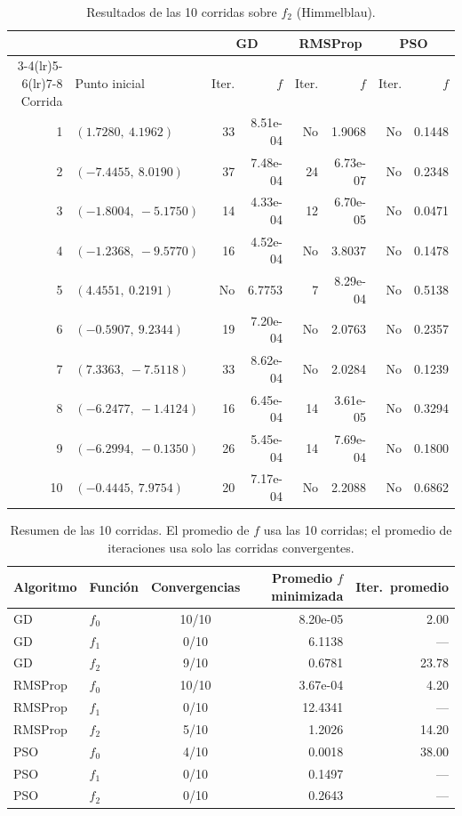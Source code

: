 \begin{table}[H]
\centering
\small
\begin{tabular}{rlrrrrrr}
\toprule
 & & \multicolumn{2}{c}{GD} & \multicolumn{2}{c}{RMSProp} & \multicolumn{2}{c}{PSO} \\
\cmidrule(lr){3-4}\cmidrule(lr){5-6}\cmidrule(lr){7-8}
Corrida & Punto inicial & Iter. & $f$ & Iter. & $f$ & Iter. & $f$ \\
\midrule
1 & $(1.7280,\ 4.1962)$ & 33 & 8.51e-04 & No & 1.9068 & No & 0.1448 \\
2 & $(-7.4455,\ 8.0190)$ & 37 & 7.48e-04 & 24 & 6.73e-07 & No & 0.2348 \\
3 & $(-1.8004,\ -5.1750)$ & 14 & 4.33e-04 & 12 & 6.70e-05 & No & 0.0471 \\
4 & $(-1.2368,\ -9.5770)$ & 16 & 4.52e-04 & No & 3.8037 & No & 0.1478 \\
5 & $(4.4551,\ 0.2191)$ & No & 6.7753 & 7 & 8.29e-04 & No & 0.5138 \\
6 & $(-0.5907,\ 9.2344)$ & 19 & 7.20e-04 & No & 2.0763 & No & 0.2357 \\
7 & $(7.3363,\ -7.5118)$ & 33 & 8.62e-04 & No & 2.0284 & No & 0.1239 \\
8 & $(-6.2477,\ -1.4124)$ & 16 & 6.45e-04 & 14 & 3.61e-05 & No & 0.3294 \\
9 & $(-6.2994,\ -0.1350)$ & 26 & 5.45e-04 & 14 & 7.69e-04 & No & 0.1800 \\
10 & $(-0.4445,\ 7.9754)$ & 20 & 7.17e-04 & No & 2.2088 & No & 0.6862 \\
\bottomrule
\end{tabular}
\caption{Resultados de las 10 corridas sobre $f_2$ (Himmelblau).}
\label{tab:eval_f2}
\end{table}

\begin{table}[H]
\centering
\begin{tabular}{llcrr}
\toprule
Algoritmo & Función & Convergencias & Promedio $f$ minimizada & Iter.\ promedio \\
\midrule
GD & $f_0$ & 10/10 & 8.20e-05 & 2.00 \\
GD & $f_1$ & 0/10 & 6.1138 & --- \\
GD & $f_2$ & 9/10 & 0.6781 & 23.78 \\
RMSProp & $f_0$ & 10/10 & 3.67e-04 & 4.20 \\
RMSProp & $f_1$ & 0/10 & 12.4341 & --- \\
RMSProp & $f_2$ & 5/10 & 1.2026 & 14.20 \\
PSO & $f_0$ & 4/10 & 0.0018 & 38.00 \\
PSO & $f_1$ & 0/10 & 0.1497 & --- \\
PSO & $f_2$ & 0/10 & 0.2643 & --- \\
\bottomrule
\end{tabular}
\caption{Resumen de las 10 corridas. El promedio de $f$ usa las 10
corridas; el promedio de iteraciones usa solo las corridas convergentes.}
\label{tab:resumen_eval}
\end{table}

